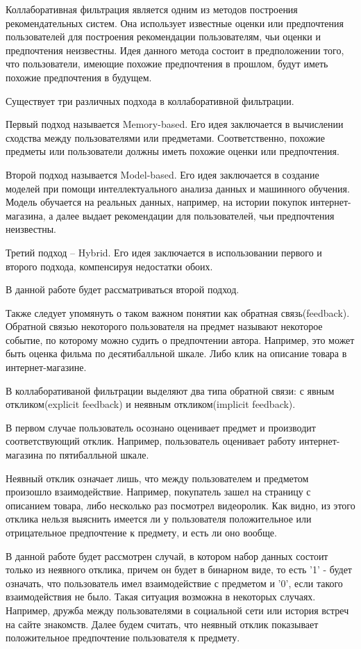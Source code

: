 \documentclass[a4paper,12pt]{article}
\begin{document}
Коллаборативная фильтрация является одним из методов построения рекомендательных систем. Она использует известные оценки или предпочтения пользователей для построения рекомендации пользователям, чьи оценки и предпочтения неизвестны. Идея данного метода состоит в предположении того, что пользователи, имеющие похожие предпочтения в прошлом, будут иметь похожие предпочтения в будущем.



Существует три различных подхода в коллаборативной фильтрации.

Первый подход называется Memory-based. Его идея заключается в вычислении сходства между пользователями или предметами. Соответственно, похожие предметы или пользователи должны иметь похожие оценки или предпочтения.

Второй подход называется Model-based. Его идея заключается в создание моделей при помощи интеллектуального анализа данных и машинного обучения. Модель обучается на реальных данных, например, на истории покупок интернет-магазина, а далее выдает рекомендации для пользователей, чьи предпочтения неизвестны. 

Третий подход -- Hybrid. Его идея заключается в использовании первого и второго подхода, компенсируя недостатки обоих. 


В данной работе будет рассматриваться второй подход.

Также следует упомянуть о таком важном понятии как обратная связь(feedback). Обратной связью некоторого пользователя на предмет называют некоторое событие, по которому можно судить о предпочтении автора. 
Например, это может быть оценка фильма по десятибалльной шкале. Либо клик на описание товара в интернет-магазине.

В коллаборативаной фильтрации выделяют два типа обратной связи: с явным откликом(explicit feedback) и неявным откликом(implicit feedback).

 В первом случае пользователь осознано оценивает предмет и производит соответствующий отклик. Например, пользователь оценивает работу интернет-магазина по пятибалльной шкале.

Неявный отклик  означает лишь, что между пользователем и предметом произошло взаимодействие. Например, покупатель зашел на страницу с описанием товара, либо несколько раз посмотрел  видеоролик. Как видно, из этого отклика нельзя выяснить имеется ли у пользователя положительное или отрицательное предпочтение к предмету, и есть ли оно вообще.

В данной работе будет рассмотрен случай, в котором набор данных состоит только из неявного отклика, причем он будет в бинарном виде, то есть '1' - будет означать, что пользователь имел взаимодействие с предметом и '0', если такого взаимодействия не было.  Такая ситуация возможна в некоторых случаях. Например, дружба между пользователями в социальной сети или история встреч на сайте знакомств. Далее будем считать, что неявный отклик показывает положительное предпочтение пользователя к предмету.
\end{document}

